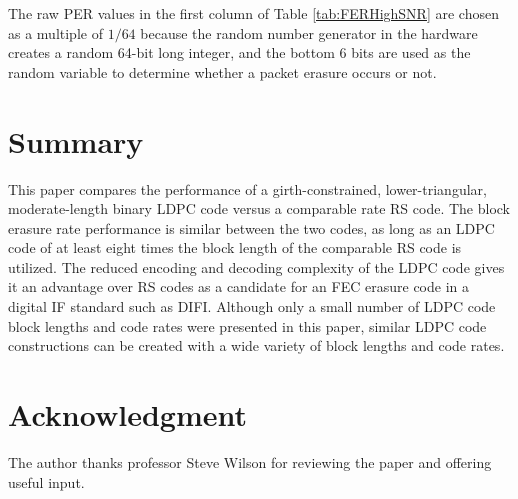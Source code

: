 \documentclass[conference]{IEEEtran}
\begin{document}
The raw PER values in the first column of Table \ref{tab:FERHighSNR} are chosen as a multiple of ${1}/{64}$ because the random number generator in the hardware creates a random 64-bit long integer, and the bottom 6 bits are used as the random variable to determine whether a packet erasure occurs or not.

\section{Summary}\label{sec:Summary}

This paper compares the performance of a girth-constrained, lower-triangular, moderate-length binary LDPC code versus a comparable rate RS code.  The block erasure rate performance is similar between the two codes, as long as an LDPC code of at least eight times the block length of the comparable RS code is utilized.  The reduced encoding and decoding complexity of the LDPC code gives it an advantage over RS codes as a candidate for an FEC erasure code in a digital IF standard such as DIFI.  Although only a small number of LDPC code block lengths and code rates were presented in this paper, similar LDPC code constructions can be created with a wide variety of block lengths and code rates.

\section*{Acknowledgment}
The author thanks professor Steve Wilson for reviewing the paper and offering useful input.  


%

\end{document}
